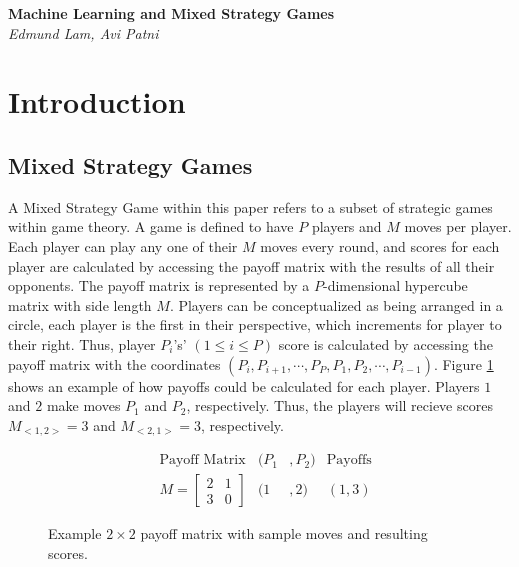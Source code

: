 \documentclass{article}
\begin{document}
\begin{titlepage}
	\begin{center}
		\Large\textbf{Machine Learning and Mixed Strategy Games}\\
		\large\textit{Edmund Lam, Avi Patni}
	\end{center}
\end{titlepage}

\section{Introduction}
\subsection{Mixed Strategy Games}
\label{subsection:MSG}
A Mixed Strategy Game within this paper refers to a subset of strategic games within game theory. A game is defined to have $P$ players and $M$ moves per player. Each player can play any one of their $M$ moves every round, and scores for each player are calculated by accessing the payoff matrix with the results of all their opponents. The payoff matrix is represented by a $P$-dimensional hypercube matrix with side length $M$. Players can be conceptualized as being arranged in a circle, each player is the first in their perspective, which increments for player to their right. Thus, player $P_i$'s' $(1\leq i\leq P)$ score is calculated by accessing the payoff matrix with the coordinates $(P_i, P_{i+1}, \cdots , P_P, P_1, P_2, \cdots , P_{i-1})$. Figure \ref{fig:1} shows an example of how payoffs could be calculated for each player. Players $1$ and $2$ make moves $P_1$ and $P_2$, respectively. Thus, the players will recieve scores $M_{<1,2>}=3$ and $M_{<2,1>}=3$, respectively.

\begin{figure}[h]
  	\begin{align*}
  	&\text{Payoff Matrix} &(P_1&,P_2) &\text{Payoffs}\\
	  &M=
	  \begin{bmatrix}
		  2 & 1\\
		  3 & 0
	  \end{bmatrix}
	  &(1&,2)
	  &(1,3)
	  \end{align*}
  \label{fig:1}
  \caption{Example $2\times2$ payoff matrix with sample moves and resulting scores.}
\end{figure}
\end{document}
